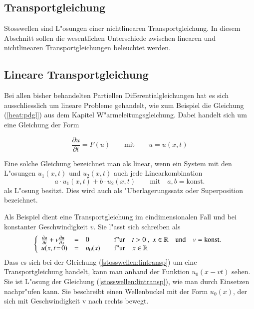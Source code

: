 \begin{refsection}
\section{Transportgleichung}
Stosswellen sind L"osungen einer nichtlinearen Transportgleichung. In
diesem Abschnitt sollen die wesentlichen Unterschiede zwischen linearen
und nichtlinearen Transportgleichungen beleuchtet werden.

\subsection{Lineare Transportgleichung}
Bei allen bisher behandelten Partiellen Differentialgleichungen hat es
sich ausschliesslich um lineare Probleme gehandelt, wie zum Beispiel
die Gleichung (\ref{heat:pdgl}) aus dem Kapitel W"armeleitungsgleichung. 
Dabei handelt sich um eine Gleichung der Form

\begin{equation}
	\frac{\partial u}{\partial t}=F(u) \qquad \text{mit} \qquad u = u(x,t) 
	\label{stosswellen:lingl}
\end{equation}

Eine solche Gleichung bezeichnet man als linear, wenn ein System mit
den L"osungen
$u_{1}(x,t)$ und $u_{2}(x,t)$ auch jede Linearkombination
\begin{equation}
	a\cdot u_{1}(x,t) + b \cdot u_{2}(x,t) \qquad \text{mit} \quad a, b = \text{konst.}
	\label{stosswellen:linbed}
\end{equation}
als L"osung besitzt. Dies wird auch als "Uberlagerungssatz oder
Superposition bezeichnet.

Als Beispiel dient eine Transportgleichung im eindimensionalen Fall und bei konstanter Geschwindigkeit $v$. Sie l"asst sich schreiben als
\begin{equation}
	\left\{
	\begin{array}{lcl}
		\frac{\partial u}{\partial t} + v\frac{\partial u}{\partial x} &=& 0 \hspace{1.25cm} \text{f"ur} \quad t>0 \; , \; x \in \mathbb{R} \quad \text{und} \quad v=\text{konst.} \\
		u(x,t\!=\!0) &=& u_{0}(x) \qquad \text{f"ur} \quad x \in \mathbb{R} 
	\end{array} \right.
	\label{stosswellen:lintransp}
\end{equation}
Dass es sich bei der Gleichung (\ref{stosswellen:lintransp}) um eine
Transportgleichung handelt, kann man anhand der Funktion $u_0(x-vt)$
sehen. Sie ist L"osung der Gleichung (\ref{stosswellen:lintransp}),
wie man  durch  Einsetzen nachpr"ufen  kann.  Sie beschreibt einen
Wellenbuckel mit der Form $u_0(x)$, der sich mit Geschwindigkeit v nach
rechts bewegt.


\end{refsection}
